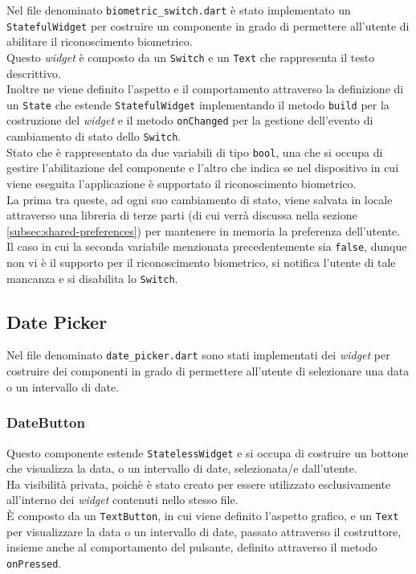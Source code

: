 Nel file denominato \lstinline{biometric_switch.dart} è stato implementato un \lstinline{StatefulWidget} per costruire un componente in grado di permettere all'utente di abilitare il riconoscimento biometrico. \\
Questo \emph{widget} è composto da un \lstinline{Switch}\cite{site:switch} e un \lstinline{Text}\cite{site:text} che rappresenta il testo descrittivo.\\
Inoltre ne viene definito l'aspetto e il comportamento attraverso la definizione di un \lstinline{State} che estende \lstinline{StatefulWidget} implementando il metodo \lstinline{build} per la costruzione del \emph{widget} e il metodo \lstinline{onChanged} per la gestione dell'evento di cambiamento di stato dello \lstinline{Switch}.\\
Stato che è rappresentato da due variabili di tipo \lstinline{bool}, una che si occupa di gestire l'abilitazione del componente e l'altro che indica se nel dispositivo in cui viene eseguita l'applicazione è supportato il riconoscimento biometrico.\\
La prima tra queste, ad ogni suo cambiamento di stato, viene salvata in locale attraverso una libreria di terze parti (di cui verrà discussa nella sezione \ref{subsec:shared-preferences}) per mantenere in memoria la preferenza dell'utente. \\
Il caso in cui la seconda variabile menzionata precedentemente sia \lstinline{false}, dunque non vi è il supporto per il riconoscimento biometrico, si notifica l'utente di tale mancanza e si disabilita lo \lstinline{Switch}.

\subsection{Date Picker}
\label{subsec:date-picker}

Nel file denominato \lstinline{date_picker.dart} sono stati implementati dei \emph{widget} per costruire dei componenti in grado di permettere all'utente di selezionare una data o un intervallo di date.

\subsubsection*{DateButton}
\label{subsubsec:date-button}

Questo componente estende \lstinline{StatelessWidget} e si occupa di costruire un bottone che visualizza la data, o un intervallo di date, selezionata/e dall'utente.\\
Ha visibilità privata, poichè è stato creato per essere utilizzato esclusivamente all'interno dei \emph{widget} contenuti nello stesso file.\\
È composto da un \lstinline{TextButton}\cite{site:text-button}, in cui viene definito l'aspetto grafico, e un \lstinline{Text} per visualizzare la data o un intervallo di date, passato attraverso il costruttore, insieme anche al comportamento del pulsante, definito attraverso il metodo \lstinline{onPressed}\cite{site:on-pressed}.

